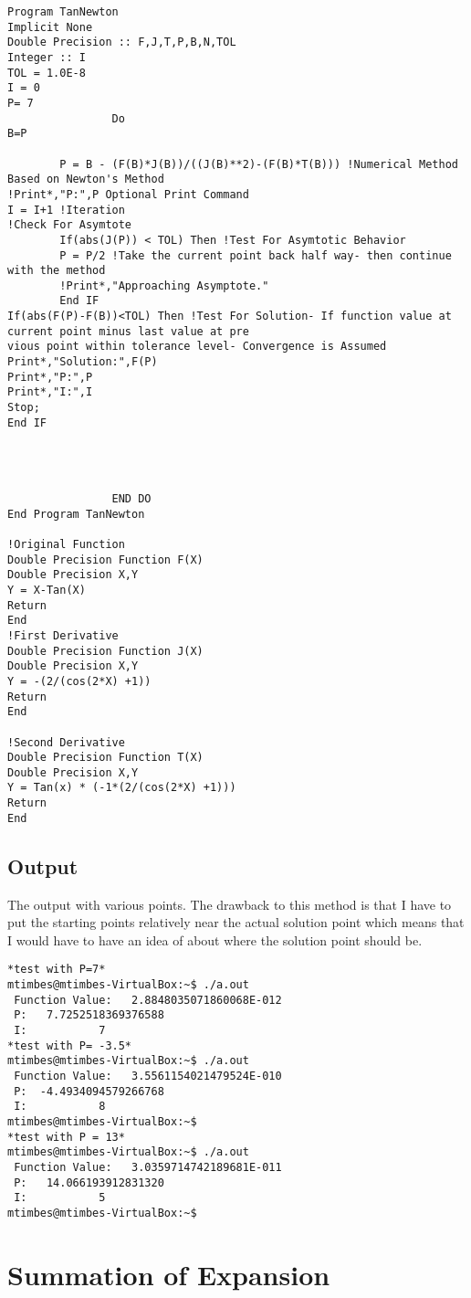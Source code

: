 \documentclass[12pt]{article}
\begin{document}
\begin{lstlisting}[language = FORTRAN]
Program TanNewton
Implicit None
Double Precision :: F,J,T,P,B,N,TOL
Integer :: I
TOL = 1.0E-8
I = 0
P= 7
                Do
B=P

        P = B - (F(B)*J(B))/((J(B)**2)-(F(B)*T(B))) !Numerical Method Based on Newton's Method
!Print*,"P:",P Optional Print Command
I = I+1 !Iteration
!Check For Asymtote
        If(abs(J(P)) < TOL) Then !Test For Asymtotic Behavior
        P = P/2 !Take the current point back half way- then continue with the method
        !Print*,"Approaching Asymptote."
        End IF
If(abs(F(P)-F(B))<TOL) Then !Test For Solution- If function value at current point minus last value at pre
vious point within tolerance level- Convergence is Assumed
Print*,"Solution:",F(P)
Print*,"P:",P
Print*,"I:",I
Stop;
End IF




                END DO
End Program TanNewton

!Original Function
Double Precision Function F(X)
Double Precision X,Y
Y = X-Tan(X)
Return
End
!First Derivative
Double Precision Function J(X)
Double Precision X,Y
Y = -(2/(cos(2*X) +1))
Return
End

!Second Derivative
Double Precision Function T(X)
Double Precision X,Y
Y = Tan(x) * (-1*(2/(cos(2*X) +1)))
Return
End

\end{lstlisting}
\subsection{Output}
The output with various points. The drawback to this method is that I have to put the starting points relatively near the actual solution point which means that I would have to have an idea of about where the solution point should be.
\begin{verbatim}
*test with P=7*
mtimbes@mtimbes-VirtualBox:~$ ./a.out
 Function Value:   2.8848035071860068E-012
 P:   7.7252518369376588     
 I:           7
*test with P= -3.5*
mtimbes@mtimbes-VirtualBox:~$ ./a.out
 Function Value:   3.5561154021479524E-010
 P:  -4.4934094579266768     
 I:           8
mtimbes@mtimbes-VirtualBox:~$ 
*test with P = 13*
mtimbes@mtimbes-VirtualBox:~$ ./a.out
 Function Value:   3.0359714742189681E-011
 P:   14.066193912831320     
 I:           5
mtimbes@mtimbes-VirtualBox:~$ 

\end{verbatim}
\section{Summation of Expansion}
\end{document}
